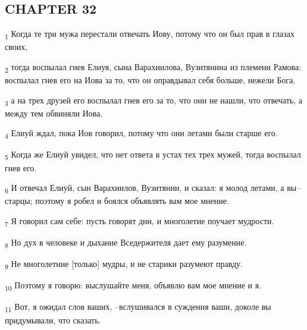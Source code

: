 \subsection{CHAPTER 32}
\begin{tcolorbox}
\textsubscript{1} Когда те три мужа перестали отвечать Иову, потому что он был прав в глазах своих,
\end{tcolorbox}
\begin{tcolorbox}
\textsubscript{2} тогда воспылал гнев Елиуя, сына Варахиилова, Вузитянина из племени Рамова: воспылал гнев его на Иова за то, что он оправдывал себя больше, нежели Бога,
\end{tcolorbox}
\begin{tcolorbox}
\textsubscript{3} а на трех друзей его воспылал гнев его за то, что они не нашли, что отвечать, а между тем обвиняли Иова.
\end{tcolorbox}
\begin{tcolorbox}
\textsubscript{4} Елиуй ждал, пока Иов говорил, потому что они летами были старше его.
\end{tcolorbox}
\begin{tcolorbox}
\textsubscript{5} Когда же Елиуй увидел, что нет ответа в устах тех трех мужей, тогда воспылал гнев его.
\end{tcolorbox}
\begin{tcolorbox}
\textsubscript{6} И отвечал Елиуй, сын Варахиилов, Вузитянин, и сказал: я молод летами, а вы--старцы; поэтому я робел и боялся объявлять вам мое мнение.
\end{tcolorbox}
\begin{tcolorbox}
\textsubscript{7} Я говорил сам себе: пусть говорят дни, и многолетие поучает мудрости.
\end{tcolorbox}
\begin{tcolorbox}
\textsubscript{8} Но дух в человеке и дыхание Вседержителя дает ему разумение.
\end{tcolorbox}
\begin{tcolorbox}
\textsubscript{9} Не многолетние [только] мудры, и не старики разумеют правду.
\end{tcolorbox}
\begin{tcolorbox}
\textsubscript{10} Поэтому я говорю: выслушайте меня, объявлю вам мое мнение и я.
\end{tcolorbox}
\begin{tcolorbox}
\textsubscript{11} Вот, я ожидал слов ваших, --вслушивался в суждения ваши, доколе вы придумывали, что сказать.
\end{tcolorbox}
